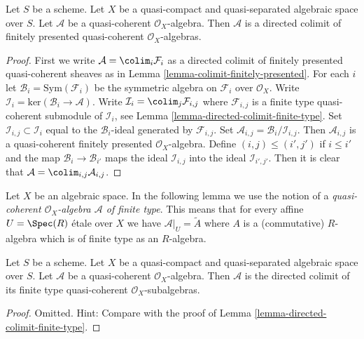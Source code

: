 \begin{lemma}
\label{lemma-algebra-directed-colimit-finite-presentation}
Let $S$ be a scheme. Let $X$ be a quasi-compact and quasi-separated
algebraic space over $S$.
Let $\mathcal{A}$ be a quasi-coherent $\mathcal{O}_X$-algebra.
Then $\mathcal{A}$ is a directed colimit of finitely presented
quasi-coherent $\mathcal{O}_X$-algebras.
\end{lemma}

\begin{proof}
First we write $\mathcal{A} = \colim_i \mathcal{F}_i$ as a directed
colimit of finitely presented quasi-coherent sheaves as in
Lemma \ref{lemma-colimit-finitely-presented}.
For each $i$ let $\mathcal{B}_i = \text{Sym}(\mathcal{F}_i)$ be the
symmetric algebra on $\mathcal{F}_i$ over $\mathcal{O}_X$. Write
$\mathcal{I}_i = \text{ker}(\mathcal{B}_i \to \mathcal{A})$. Write
$\mathcal{I}_i = \colim_j \mathcal{F}_{i, j}$ where
$\mathcal{F}_{i, j}$ is a finite type quasi-coherent submodule of
$\mathcal{I}_i$, see
Lemma \ref{lemma-directed-colimit-finite-type}.
Set $\mathcal{I}_{i, j} \subset \mathcal{I}_i$
equal to the $\mathcal{B}_i$-ideal generated by $\mathcal{F}_{i, j}$.
Set $\mathcal{A}_{i, j} = \mathcal{B}_i/\mathcal{I}_{i, j}$.
Then $\mathcal{A}_{i, j}$ is a quasi-coherent finitely presented
$\mathcal{O}_X$-algebra. Define $(i, j) \leq (i', j')$ if
$i \leq i'$ and the map $\mathcal{B}_i \to \mathcal{B}_{i'}$
maps the ideal $\mathcal{I}_{i, j}$ into the ideal $\mathcal{I}_{i', j'}$.
Then it is clear that $\mathcal{A} = \colim_{i, j} \mathcal{A}_{i, j}$.
\end{proof}

\noindent
Let $X$ be an algebraic space. In the following lemma we use the notion
of a {\it quasi-coherent $\mathcal{O}_X$-algebra $\mathcal{A}$
of finite type}. This means that for every affine
$U = \Spec(R)$ \'etale over $X$ we have $\mathcal{A}|_U = \widetilde{A}$
where $A$ is a (commutative) $R$-algebra which is of finite type
as an $R$-algebra.

\begin{lemma}
\label{lemma-algebra-directed-colimit-finite-type}
Let $S$ be a scheme. Let $X$ be a quasi-compact and quasi-separated algebraic
space over $S$. Let $\mathcal{A}$ be a quasi-coherent $\mathcal{O}_X$-algebra.
Then $\mathcal{A}$ is the directed colimit of its finite type
quasi-coherent $\mathcal{O}_X$-subalgebras.
\end{lemma}

\begin{proof}
Omitted. Hint: Compare with the proof of
Lemma \ref{lemma-directed-colimit-finite-type}.
\end{proof}

